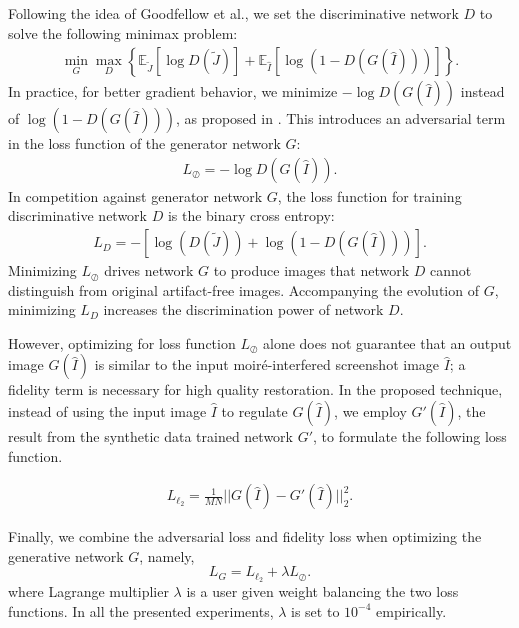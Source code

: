 \documentclass[10pt,twocolumn,letterpaper]{article}
\begin{document}
Following the idea of Goodfellow et al., we set the discriminative
network $D$ to solve the following minimax problem:
\begin{align}
  \min_G \max_D \left\{ \mathbb{E}_{\tilde{J}} \left[ \log D(\tilde{J}) \right] +
    \mathbb{E}_{\hat{I}} \left[ \log(1-D(G(\hat{I}))) \right] \right\}.
\end{align}
In practice, for better gradient behavior, we minimize $-\log
D(G(\hat{I}))$ instead of $\log(1-D(G(\hat{I})))$, as proposed in
\cite{goodfellow2014generative}.  This introduces an adversarial term
in the loss function of the generator network $G$:
\begin{align}
  L_\oslash = -\log D(G(\hat{I})) .
\end{align}
In competition against generator network $G$, the loss function for
training discriminative network $D$ is the binary cross entropy:
\begin{align}
  L_D = - \left[ \log(D(\tilde{J}))+\log(1-D(G(\hat{I}))) \right].
\label{loss_D}
\end{align}
Minimizing $L_\oslash$ drives network $G$ to produce images that
network $D$ cannot distinguish from original artifact-free images.
Accompanying the evolution of $G$, minimizing $L_D$ increases the
discrimination power of network $D$.

However, optimizing for loss function $L_\oslash$ alone does not
guarantee that an output image $G(\hat{I})$ is similar to the input
moir\'e-interfered screenshot image $\hat{I}$; a fidelity term is
necessary for high quality restoration.  In the proposed technique,
instead of using the input image $\hat{I}$ to regulate $G(\hat{I})$,
we employ $G'(\hat{I})$, the result from the synthetic data trained
network $G'$, to formulate the following loss function.

\begin{align}
  L_{\ell_2} = \frac{1}{MN}||G(\hat{I}) - G'(\hat{I})||_2^2.
\end{align}

Finally, we combine the adversarial loss and fidelity loss when
optimizing the generative network $G$, namely,
\begin{equation}
  L_G = L_{\ell_2} + \lambda L_\oslash.
  \label{eq:joint training}
\end{equation}
where Lagrange multiplier $\lambda$ is a user given weight balancing
the two loss functions.  In all the presented experiments, $\lambda$
is set to $10^{-4}$ empirically.
\end{document}
